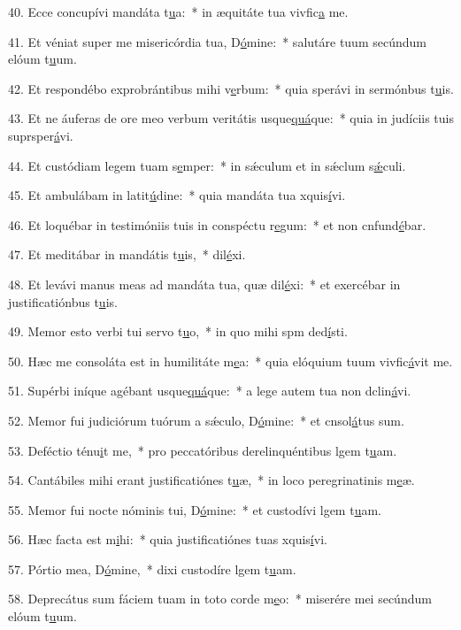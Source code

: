 40. Ecce concupívi mandáta t\uline{u}a:~* in æquitáte tua vivfic\uline{a} me.\par 
41. Et véniat super me misericórdia tua, D\uline{ó}mine:~* salutáre tuum secúndum elóum t\uline{u}um.\par 
42. Et respondébo exprobrántibus mihi v\uline{e}rbum:~* quia sperávi in sermónbus t\uline{u}is.\par 
43. Et ne áuferas de ore meo verbum veritátis usque\uline{quá}que:~* quia in judíciis tuis suprsper\uline{á}vi.\par 
44. Et custódiam legem tuam s\uline{e}mper:~* in sǽculum et in sǽclum s\uline{ǽ}culi.\par 
45. Et ambulábam in latit\uline{ú}dine:~* quia mandáta tua xquis\uline{í}vi.\par 
46. Et loquébar in testimóniis tuis in conspéctu r\uline{e}gum:~* et non cnfund\uline{é}bar.\par 
47. Et meditábar in mandátis t\uline{u}is,~*  dil\uline{é}xi.\par 
48. Et levávi manus meas ad mandáta tua, quæ dil\uline{é}xi:~* et exercébar in justificatiónbus t\uline{u}is.\par 
49. Memor esto verbi tui servo t\uline{u}o,~* in quo mihi spm ded\uline{í}sti.\par 
50. Hæc me consoláta est in humilitáte m\uline{e}a:~* quia elóquium tuum vivfic\uline{á}vit me.\par 
51. Supérbi iníque agébant usque\uline{quá}que:~* a lege autem tua non dclin\uline{á}vi.\par 
52. Memor fui judiciórum tuórum a sǽculo, D\uline{ó}mine:~* et cnsol\uline{á}tus sum.\par 
53. Deféctio ténu\uline{i}t me,~* pro peccatóribus derelinquéntibus lgem t\uline{u}am.\par 
54. Cantábiles mihi erant justificatiónes t\uline{u}æ,~* in loco peregrinatinis m\uline{e}æ.\par 
55. Memor fui nocte nóminis tui, D\uline{ó}mine:~* et custodívi lgem t\uline{u}am.\par 
56. Hæc facta est m\uline{i}hi:~* quia justificatiónes tuas xquis\uline{í}vi.\par 
57. Pórtio mea, D\uline{ó}mine,~* dixi custodíre lgem t\uline{u}am.\par 
58. Deprecátus sum fáciem tuam in toto corde m\uline{e}o:~* miserére mei secúndum elóum t\uline{u}um.\par 
